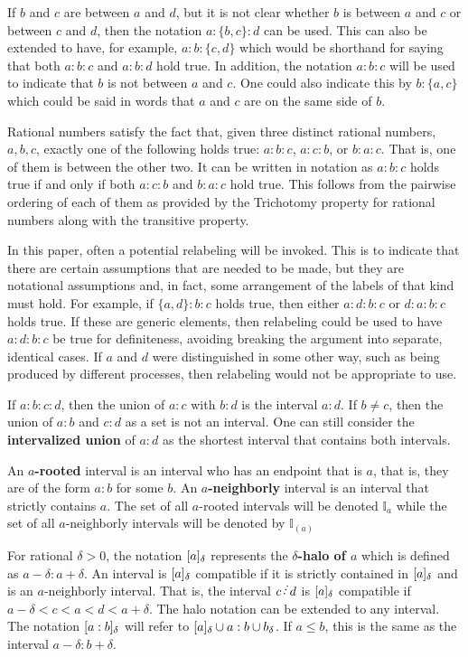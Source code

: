 \documentclass[12pt]{article}
\begin{document}
If $b$ and $c$ are between $a$ and $d$, but it is not clear whether $b$ is between $a$ and $c$ or between $c$ and $d$, then the notation $a:\{b,c\}:d$ can be used. This can also be extended to have, for example, $a:b:\{c,d\}$ which would be shorthand for saying that both $a:b:c$ and $a:b:d$ hold true. In addition, the notation \sout{$a:b:c$} will be used to indicate that $b$ is not between $a$ and $c$. One could also indicate this by $b:\{a,c\}$ which could be said in words that $a$ and $c$ are on the same side of $b$. 

Rational numbers satisfy the fact that, given three distinct rational numbers, $a, b, c$, exactly one of the following holds true: $a:b:c$, $a:c:b$, or $b:a:c$. That is, one of them is between the other two. It can be written in notation as $a:b:c$ holds true if and only if both \sout{$a:c:b$} and \sout{$b:a:c$} hold true. This follows from the pairwise ordering of each of them as provided by the Trichotomy property for rational numbers along with the transitive property. 

In this paper, often a potential relabeling will be invoked. This is to indicate that there are certain assumptions that are needed to be made, but they are notational assumptions and, in fact, some arrangement of the labels of that kind must hold. For example, if $\{a,d\}:b:c$ holds true, then either $a:d:b:c$ or $d:a:b:c$ holds true. If these are generic elements, then relabeling could be used to have $a:d:b:c$  be  true for definiteness, avoiding breaking the argument into separate, identical cases. If $a$ and $d$ were distinguished in some other way, such as being produced by different processes, then relabeling would not be appropriate to use. 

If $a:b:c:d$, then the union of $a:c$ with $b:d$ is the interval $a:d$. If $b \neq c$, then the union of $a:b$ and $c:d$ as a set is not an interval. One can still consider the \textbf{intervalized union} of $a:d$ as the shortest interval that contains both intervals. 

An \textbf{$a$-rooted} interval is an interval who has an endpoint that is $a$, that is, they are of the form $a:b$ for some $b$. An  \textbf{$a$-neighborly} interval is an interval that strictly contains $a$. The set of all $a$-rooted intervals will be denoted $\mathbb{I}_a$ while the set of all $a$-neighborly intervals will be denoted by $\mathbb{I}_{(a)}$

For rational $\delta > 0$, the notation $[a]_{\delta}$ represents the \textbf{$\delta$-halo of $a$} which is defined as $a -\delta : a+ \delta$. An interval is $[a]_{\delta}$ compatible if it is strictly contained in $[a]_{\delta}$ and is an $a$-neighborly interval. That is, the interval $c\lte d$ is $[a]_{\delta}$ compatible if $a- \delta < c < a < d < a+ \delta$. The halo notation can be extended to any interval. The notation $[a:b]_{\delta}$ will refer to $[a]_{\delta} \cup a:b \cup b_\delta$. If $a \leq b$, this is the same as the interval $a-\delta:b+\delta$. 
\end{document}
